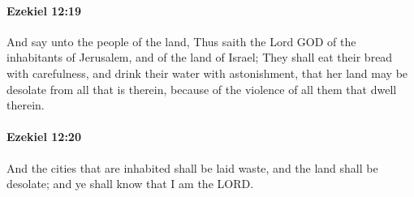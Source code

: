 		\paragraph{Ezekiel 12:19} %
			\label{EZEKIEL-12-19}

			And say unto the people of the land, Thus saith the Lord GOD of the inhabitants of Jerusalem, and of the land of Israel; They shall eat their bread with carefulness, and drink their water with astonishment, that her land may be desolate from all that is therein, because of the violence of all them that dwell therein.


		\paragraph{Ezekiel 12:20} %
			\label{EZEKIEL-12-20}

			And the cities that are inhabited shall be laid waste, and the land shall be desolate; and ye shall know that I am the LORD.

